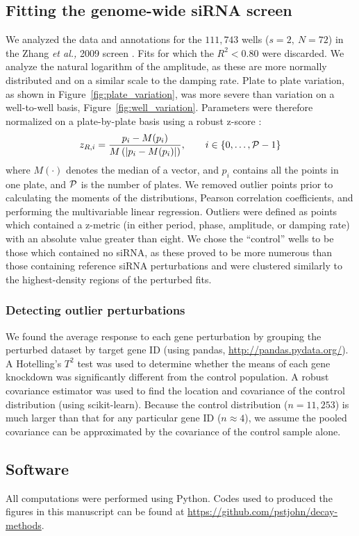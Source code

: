 \documentclass[11pt, letterpaper]{article}
\begin{document}
\subsection*{Fitting the genome-wide siRNA screen}
We analyzed the data and annotations for the $111,743$ wells ($s=2,\ N=72$) in the Zhang {\itshape et al.,} 2009 screen \cite{Zhang2009}.
Fits for which the $R^2 < 0.80$ were discarded.
We analyze the natural logarithm of the amplitude, as these are more normally distributed and on a similar scale to the damping rate.
Plate to plate variation, as shown in Figure~\ref{fig:plate_variation}, was more severe than variation on a well-to-well basis, Figure~\ref{fig:well_variation}.
Parameters were therefore normalized on a plate-by-plate basis using a robust z-score \cite{Birmingham2009}:
\[
  z_{R,i} = \frac{p_i - M(p_i)}{M\left(\left|p_i - M(p_i)\right|\right)}, \qquad i \in \{0, \dots, {\cal P} - 1 \}
\]
where $M(\cdot)$ denotes the median of a vector, and $p_i$ contains all the points in one plate, and $\cal P$ is the number of plates.
We removed outlier points prior to calculating the moments of the distributions, Pearson correlation coefficients, and performing the multivariable linear regression.
Outliers were defined as points which contained a z-metric (in either period, phase, amplitude, or damping rate) with an absolute value greater than eight.
We chose the ``control'' wells to be those which contained no siRNA, as these proved to be more numerous than those containing reference siRNA perturbations and were clustered similarly to the highest-density regions of the perturbed fits.

\subsubsection*{Detecting outlier perturbations}
We found the average response to each gene perturbation by grouping the perturbed dataset by target gene ID (using pandas, \url{http://pandas.pydata.org/}).
A Hotelling's $T^2$ test was used to determine whether the means of each gene knockdown was significantly different from the control population.
A robust covariance estimator was used to find the location and covariance of the control distribution (using scikit-learn).
Because the control distribution ($n=11,253$) is much larger than that for any particular gene ID ($n \approx 4$), we assume the pooled covariance can be approximated by the covariance of the control sample alone.

\subsection*{Software}
All computations were performed using Python.
Codes used to produced the figures in this manuscript can be found at \url{https://github.com/pstjohn/decay-methods}.
\end{document}
